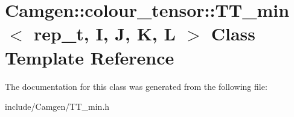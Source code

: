 \hypertarget{a00536}{\section{Camgen\-:\-:colour\-\_\-tensor\-:\-:T\-T\-\_\-min$<$ rep\-\_\-t, I, J, K, L $>$ Class Template Reference}
\label{a00536}
}


The documentation for this class was generated from the following file\-:\begin{DoxyCompactItemize}
\item 
include/\-Camgen/T\-T\-\_\-min.\-h\end{DoxyCompactItemize}
